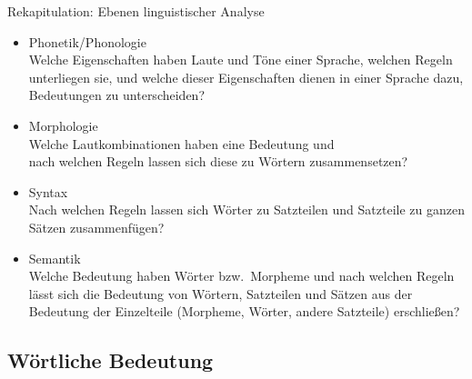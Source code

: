 \begin{frame}{Rekapitulation: Ebenen linguistischer Analyse}

  \begin{itemize}
  \item Phonetik/Phonologie\\
Welche Eigenschaften haben Laute und Töne einer Sprache, welchen Regeln unterliegen sie, und welche dieser Eigenschaften dienen in einer Sprache dazu, Bedeutungen zu unterscheiden?

  \item<2-> Morphologie\\
   Welche Lautkombinationen haben eine Bedeutung und\\ nach welchen Regeln lassen sich diese zu Wörtern zusammensetzen?

  \item<3-> Syntax\\
 Nach welchen Regeln lassen sich Wörter zu Satzteilen und Satzteile zu ganzen Sätzen zusammenfügen?

  \item<4-> Semantik\\
 Welche Bedeutung haben Wörter bzw.\ Morpheme und nach welchen Regeln lässt sich die Bedeutung von Wörtern,
 Satzteilen und Sätzen aus der Bedeutung der Einzelteile (Morpheme, Wörter, andere Satzteile) erschließen?
  \end{itemize}
\end{frame}


\subsection{Wörtliche Bedeutung}



